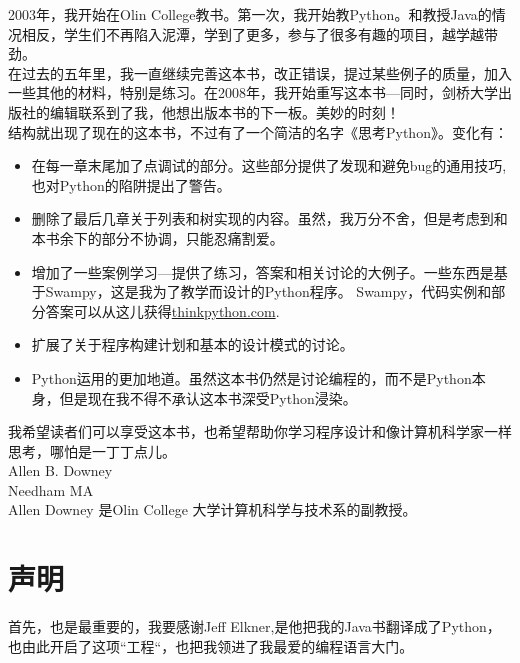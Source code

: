  2003年，我开始在Olin College教书。第一次，我开始教Python。和教授Java的情况相反，学生们不再陷入泥潭，学到了更多，参与了很多有趣的项目，越学越带劲。\\

 在过去的五年里，我一直继续完善这本书，改正错误，提过某些例子的质量，加入一些其他的材料，特别是练习。在2008年，我开始重写这本书---同时，剑桥大学出版社的编辑联系到了我，他想出版本书的下一板。美妙的时刻！\\

 结构就出现了现在的这本书，不过有了一个简洁的名字《思考Python》。变化有：
 \begin{itemize}

 \item 在每一章末尾加了点调试的部分。这些部分提供了发现和避免bug的通用技巧,也对Python的陷阱提出了警告。

 \item 删除了最后几章关于列表和树实现的内容。虽然，我万分不舍，但是考虑到和本书余下的部分不协调，只能忍痛割爱。

 \item 增加了一些案例学习---提供了练习，答案和相关讨论的大例子。一些东西是基于Swampy，这是我为了教学而设计的Python程序。
 Swampy，代码实例和部分答案可以从这儿获得\url{thinkpython.com}.

 \item 扩展了关于程序构建计划和基本的设计模式的讨论。

 \item Python运用的更加地道。虽然这本书仍然是讨论编程的，而不是Python本身，但是现在我不得不承认这本书深受Python浸染。
 
 \end{itemize}

  我希望读者们可以享受这本书，也希望帮助你学习程序设计和像计算机科学家一样思考，哪怕是一丁丁点儿。\\

Allen B. Downey\\
Needham MA\\

Allen Downey 是Olin College 大学计算机科学与技术系的副教授。



\section*{声明}

首先，也是最重要的，我要感谢Jeff Elkner,是他把我的Java书翻译成了Python，也由此开启了这项“工程“，也把我领进了我最爱的编程语言大门。\\

